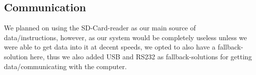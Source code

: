 \subsection {Communication}
We planned on using the SD-Card-reader as our main source of data/instructions, however, as our system would
be completely useless unless we were able to get data into it at decent speeds, we opted to also have a fallback-solution
here, thus we also added USB and RS232 as fallback-solutions for getting data/communicating with the computer.

